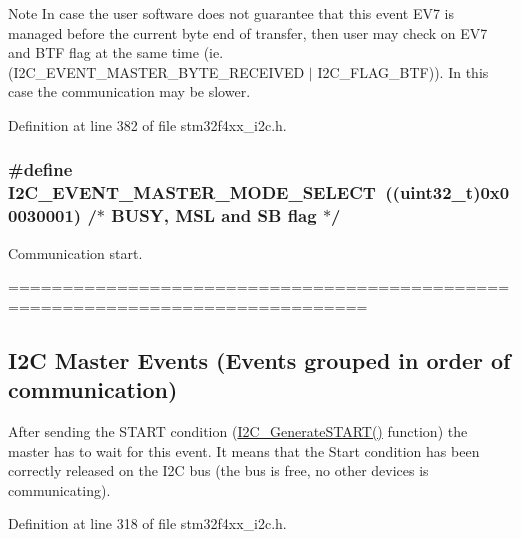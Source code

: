 \begin{DoxyNote}{Note}
In case the user software does not guarantee that this event E\-V7 is managed before the current byte end of transfer, then user may check on E\-V7 and B\-T\-F flag at the same time (ie. (I2\-C\-\_\-\-E\-V\-E\-N\-T\-\_\-\-M\-A\-S\-T\-E\-R\-\_\-\-B\-Y\-T\-E\-\_\-\-R\-E\-C\-E\-I\-V\-E\-D $|$ I2\-C\-\_\-\-F\-L\-A\-G\-\_\-\-B\-T\-F)). In this case the communication may be slower. 
\end{DoxyNote}


Definition at line 382 of file stm32f4xx\-\_\-i2c.\-h.

\hypertarget{group___i2_c___events_gaeef8c22ac035122b06e31b360ac7aeb3}{
\subsubsection[{I2\-C\-\_\-\-E\-V\-E\-N\-T\-\_\-\-M\-A\-S\-T\-E\-R\-\_\-\-M\-O\-D\-E\-\_\-\-S\-E\-L\-E\-C\-T}]{\setlength{\rightskip}{0pt plus 5cm}\#define I2\-C\-\_\-\-E\-V\-E\-N\-T\-\_\-\-M\-A\-S\-T\-E\-R\-\_\-\-M\-O\-D\-E\-\_\-\-S\-E\-L\-E\-C\-T~((uint32\-\_\-t)0x00030001)  /$\ast$ B\-U\-S\-Y, M\-S\-L and S\-B flag $\ast$/}}\label{group___i2_c___events_gaeef8c22ac035122b06e31b360ac7aeb3}


Communication start. 

=============================================================================== \subsection*{I2\-C Master Events (Events grouped in order of communication) }

After sending the S\-T\-A\-R\-T condition (\hyperlink{group___i2_c_ga36c522b471588be9779c878222ccb20f}{I2\-C\-\_\-\-Generate\-S\-T\-A\-R\-T()} function) the master has to wait for this event. It means that the Start condition has been correctly released on the I2\-C bus (the bus is free, no other devices is communicating). 

Definition at line 318 of file stm32f4xx\-\_\-i2c.\-h.

